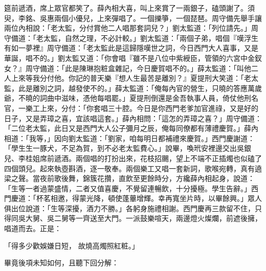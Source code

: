 筵前遞酒，席上眾官都笑了。薛內相大喜，叫上來賞了一兩銀子，磕頭謝了。須臾，李銘、吳惠兩個小優兒，上來彈唱了。一個擽箏，一個琵琶。周守備先舉手讓兩位內相說：「老太監，分付賞他二人唱那套詞兒？」劉太監道：「列位請先。」周守備道：「老太監，自然之理，不必計較。」劉太監道：「兩個子弟，唱個『嘆浮生有如一夢裡』周守備道：「老太監此是這歸隱嘆世之詞，今日西門大人喜事，又是華誕，唱不的。」劉太監又道：「你會唱『雖不是八位中紫綬臣，管領的六宮中金釵女？』周守備道：「此是陳琳抱粧盒雜記，今日慶賀唱不的。」薛太監道：「叫他二人上來等我分付他。你記的普天樂『想人生最苦是離別？』夏提刑大笑道：「老太監，此是離別之詞，越發使不的。」薛太監道：「俺每內官的營生，只曉的答應萬歲爺，不曉的詞曲中滋味，憑他每唱罷。」夏提刑倒還是金吾執事人員，倚仗他刑名官，一樂工上來，分付：「你套唱三十腔。今日是你西門老爹加官進祿，又是好的日子，又是弄璋之喜，宜該唱這套。」薛內相問：「這怎的弄璋之喜？」周守備道：「二位老太監，此日又是西門大人公子彌月之辰，俺每同僚都有薄禮慶賀。」薛內相道：「我等，」因向劉太監道：「劉家，咱每明日都補禮來慶賀。」西門慶謝道：「學生生一豚犬，不足為賀，到不必老太監費心。」說畢，喚玳安裡邊交出吳銀兒、李桂姐席前遞酒。兩個唱的打扮出來，花枝招颺，望上不端不正插燭也似磕了四個頭兒。起來執壺斟酒，逐一敬奉。兩個樂工又唱一套新詞，歌喉宛轉，真有遶梁之聲。當夜前歌後舞，錦簇花攢，直飲至更餘時分，方纔薛內相起身，說道：「生等一者過蒙盛情，二者又值喜慶，不覺留連暢飲，十分擾極。學生告辭。」西門慶道：「杯茗相邀，得蒙光降，頓使蓬蓽增輝。幸再寬坐片時，以畢餘興。」眾人俱出位說道：「生等深擾，酒力不勝。」各躬身施禮相謝。西門慶再三款留不住，只得同吳大舅、吳二舅等一齊送至大門。一派鼓樂喧天，兩邊燈火燦爛，前遮後擁，唱道而去。正是：

「得多少歡娛嫌日短，  故燒高燭照紅粧。」

畢竟後項未知如何，且聽下回分解：

